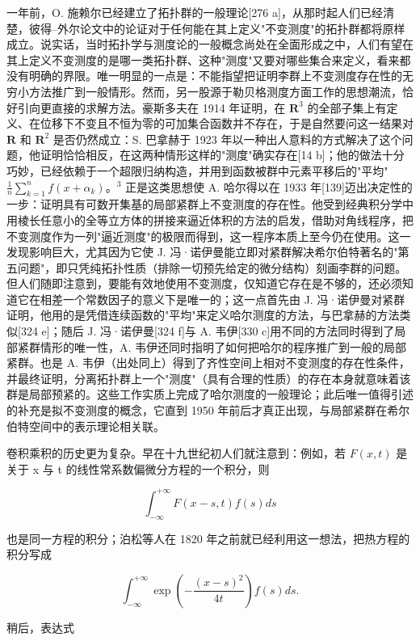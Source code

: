 一年前，O. 施赖尔已经建立了拓扑群的一般理论{[}276 a{]}，从那时起人们已经清楚，彼得–外尔论文中的论证对于任何能在其上定义"不变测度"的拓扑群都将原样成立。说实话，当时拓扑学与测度论的一般概念尚处在全面形成之中，人们有望在其上定义不变测度的是哪一类拓扑群、这种"测度"又要对哪些集合来定义，看来都没有明确的界限。唯一明显的一点是：不能指望把证明李群上不变测度存在性的无穷小方法推广到一般情形。然而，另一股源于勒贝格测度方面工作的思想潮流，恰好引向更直接的求解方法。豪斯多夫在 1914 年证明，在 \(\mathbf{R}^3\) 的全部子集上有定义、在位移下不变且不恒为零的可加集合函数并不存在，于是自然要问这一结果对 \(\mathbf{R}\) 和 \(\mathbf{R}^2\) 是否仍然成立：S. 巴拿赫于 1923 年以一种出人意料的方式解决了这个问题，他证明恰恰相反，在这两种情形这样的"测度"确实存在{[}14 b{]}；他的做法十分巧妙，已经依赖于一个超限归纳构造，并用到函数被群中元素平移后的"平均"\(\frac{1}{n} \sum_{k=1}^{n} f(x + \alpha_k)\)。\(^3\) 正是这类思想使 A. 哈尔得以在 1933 年{[}139{]}迈出决定性的一步：证明具有可数开集基的局部紧群上不变测度的存在性。他受到经典积分学中用棱长任意小的全等立方体的拼接来逼近体积的方法的启发，借助对角线程序，把不变测度作为一列"逼近测度"的极限而得到，这一程序本质上至今仍在使用。这一发现影响巨大，尤其因为它使 J. 冯·诺伊曼能立即对紧群解决希尔伯特著名的"第五问题"，即只凭纯拓扑性质（排除一切预先给定的微分结构）刻画李群的问题。但人们随即注意到，要能有效地使用不变测度，仅知道它存在是不够的，还必须知道它在相差一个常数因子的意义下是唯一的；这一点首先由 J. 冯·诺伊曼对紧群证明，他用的是凭借连续函数的"平均"来定义哈尔测度的方法，与巴拿赫的方法类似{[}324 e{]}；随后 J. 冯·诺伊曼{[}324 f{]}与 A. 韦伊{[}330 c{]}用不同的方法同时得到了局部紧群情形的唯一性，A. 韦伊还同时指明了如何把哈尔的程序推广到一般的局部紧群。也是 A. 韦伊（出处同上）得到了齐性空间上相对不变测度的存在性条件，并最终证明，分离拓扑群上一个"测度"（具有合理的性质）的存在本身就意味着该群是局部预紧的。这些工作实质上完成了哈尔测度的一般理论；此后唯一值得引述的补充是拟不变测度的概念，它直到 1950 年前后才真正出现，与局部紧群在希尔伯特空间中的表示理论相关联。

卷积乘积的历史更为复杂。早在十九世纪初人们就注意到：例如，若 \(F(x,t)\) 是关于 x 与 t 的线性常系数偏微分方程的一个积分，则

\[
\int_ {- \infty} ^ {+ \infty} F (x - s, t) f (s) d s
\]

也是同一方程的积分；泊松等人在 1820 年之前就已经利用这一想法，把热方程的积分写成

\[
\int_ {- \infty} ^ {+ \infty} \exp \left(- \frac {(x - s) ^ {2}}{4 t}\right) f (s) d s.\tag{23.1}
\]

稍后，表达式

